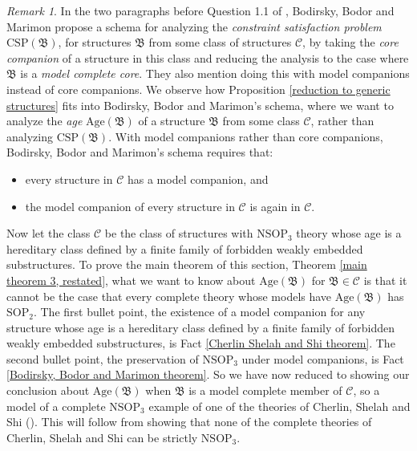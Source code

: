 \documentclass{amsart}
\theoremstyle{definition}
\theoremstyle{remark}
\newtheorem{remark}[theorem]{Remark}
\numberwithin{equation}{section}
\begin{document}
\begin{remark}
  \label{Bodirsky, Bodor and Marimon schema} In the two paragraphs before Question 1.1 of  \cite{BBM25}, Bodirsky, Bodor and Marimon propose a schema for analyzing the \textit{constraint satisfaction problem} $\mathrm{CSP}(\mathfrak{B})$, for structures $\mathfrak{B}$ from some class of structures $\mathcal{C}$, by taking the \textit{core companion} of a structure in this class and reducing the analysis to the case where $\mathfrak{B}$ is a \textit{model complete core}. They also mention doing this with model companions instead of core companions. We observe how Proposition \ref{reduction to generic structures} fits into Bodirsky, Bodor and Marimon's schema, where we want to analyze the \textit{age} $\mathrm{Age}(\mathfrak{B})$ of a structure $\mathfrak{B}$ from some class $\mathcal{C}$, rather than analyzing $\mathrm{CSP}(\mathfrak{B})$. With model companions rather than core companions, Bodirsky, Bodor and Marimon's schema requires that:

  \begin{itemize}
      \item every structure in $\mathcal{C}$ has a model companion, and
      \item the model companion of every structure in $\mathcal{C}$ is again in $\mathcal{C}$.
  \end{itemize}

Now let the class $\mathcal{C}$ be the class of structures with $\mathrm{NSOP}_{3}$ theory whose age is a hereditary class defined by a finite family of forbidden weakly embedded substructures. To prove the main theorem of this section, Theorem \ref{main theorem 3, restated}, what we want to know about $\mathrm{Age}(\mathfrak{B})$ for $\mathfrak{B} \in \mathcal{C}$ is that it cannot be the case that every complete theory whose models have $\mathrm{Age}(\mathfrak{B})$ has $\mathrm{SOP}_{2}$. The first bullet point, the existence of a model companion for any structure whose age is a hereditary class defined by a finite family of forbidden weakly embedded substructures, is Fact \ref{Cherlin Shelah and Shi theorem}. The second bullet point, the preservation of $\mathrm{NSOP}_{3}$ under model companions, is Fact \ref{Bodirsky, Bodor and Marimon theorem}. So we have now reduced to showing our conclusion about $\mathrm{Age}(\mathfrak{B})$ when $\mathfrak{B}$ is a model complete member of $\mathcal{C}$, so a model of a complete $\mathrm{NSOP}_{3}$ example of one of the theories of Cherlin, Shelah and Shi (\cite{CSS99}). This will follow from showing that none of the complete theories of Cherlin, Shelah and Shi can be strictly $\mathrm{NSOP}_{3}$.



\end{remark}
\end{document}
